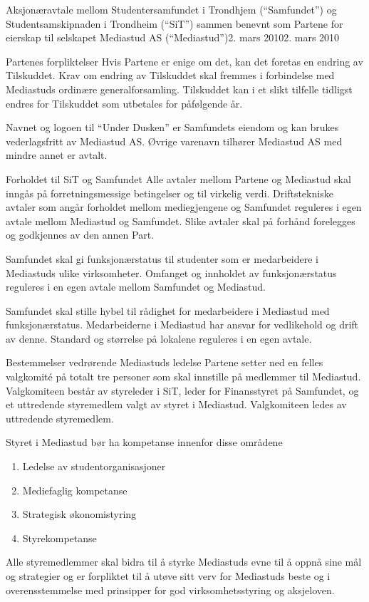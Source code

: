 \begin{instruks}{Aksjonæravtale mellom Studentersamfundet i Trondhjem
(``Samfundet'') og
Studentsamskipnaden i Trondheim (``SiT'') sammen benevnt som Partene for
eierskap til selskapet Mediastud AS (``Mediastud'')}{2. mars 2010}{2. mars 2010}
\begin{instruksledd}{Partenes forpliktelser}
	Hvis Partene er enige om det, kan det foretas en endring av Tilskuddet.
	Krav om endring av Tilskuddet skal fremmes i forbindelse med Mediastuds
	ordinære generalforsamling.  Tilskuddet kan i et slikt tilfelle tidligst
	endres for Tilskuddet som utbetales for påfølgende år.
	
	Navnet og logoen til ``Under Dusken'' er Samfundets eiendom og kan brukes
	vederlagsfritt av Mediastud AS. Øvrige varenavn tilhører Mediastud AS
	med mindre annet er avtalt.
	\end{instruksledd}

	\begin{instruksledd}{Forholdet til SiT og Samfundet}
	Alle avtaler mellom Partene og Mediastud skal inngås på
	forretningsmessige betingelser og til virkelig verdi. Driftstekniske
	avtaler som angår forholdet mellom mediegjengene og Samfundet reguleres
	i egen avtale mellom Mediastud og Samfundet. Slike avtaler skal på
	forhånd forelegges og godkjennes av den annen Part. 
	
	Samfundet skal gi funksjonærstatus til studenter som er medarbeidere i
	Mediastuds ulike virksomheter. Omfanget og innholdet av funksjonærstatus
	reguleres i en egen avtale mellom Samfundet og Mediastud.
	
	Samfundet skal stille hybel til rådighet for medarbeidere i Mediastud
	med funksjonærstatus.  Medarbeiderne i Mediastud har ansvar for
	vedlikehold og drift av denne. Standard og størrelse på lokalene
	reguleres i en egen avtale.
	\end{instruksledd}

	\begin{instruksledd}{Bestemmelser vedrørende Mediastuds ledelse}
		Partene setter ned en felles valgkomité på totalt tre personer
		som skal innstille på medlemmer til Mediastud. Valgkomiteen
		består av styreleder i SiT, leder for Finansstyret på Samfundet,
		og et uttredende styremedlem valgt av styret i Mediastud.
		Valgkomiteen ledes av uttredende styremedlem.

		Styret i Mediastud bør ha kompetanse innenfor disse områdene
		\begin{enumerate}
			\item Ledelse av studentorganisasjoner
			\item Mediefaglig kompetanse
			\item Strategisk økonomistyring
			\item Styrekompetanse
		\end{enumerate}

		Alle styremedlemmer skal bidra til å styrke Mediastuds evne til
		å oppnå sine mål og strategier og er forpliktet til å utøve sitt
		verv for Mediastuds beste og i overensstemmelse med prinsipper
		for god virksomhetsstyring og aksjeloven.


\end{instruksledd}
\end{instruks}
